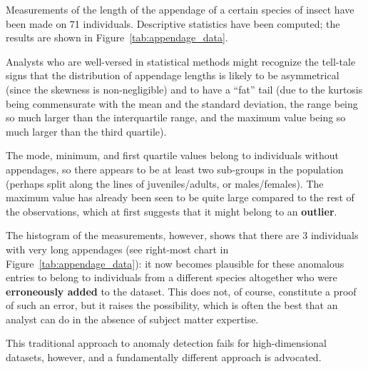 \begin{Example}
Measurements of the length of the appendage of a certain species of insect have been made on 71 individuals. Descriptive statistics have been computed; the results are shown in Figure~\ref{tab:appendage_data}.

\newpage\noindent Analysts who are well-versed in statistical methods might recognize the tell-tale signs that the distribution of appendage lengths is likely to be asymmetrical (since the skewness is non-negligible) and to have a ``fat'' tail (due to the kurtosis being commensurate with the mean and the standard deviation, the range being so much larger than the interquartile range, and the maximum value being so much larger than the third quartile). \par The mode, minimum, and first quartile values belong to individuals without appendages, so there appears to be at least two sub-groups in the population (perhaps split along the lines of juveniles/adults, or males/females). The maximum value has already been seen to be quite large compared to the rest of the observations, which at first suggests that it might belong to an \textbf{outlier}. \par The histogram of the measurements, however, shows that there are 3 individuals with very long appendages (see right-most chart in Figure~\ref{tab:appendage_data}): it now becomes plausible for these anomalous entries to belong to individuals from a different species altogether who were \textbf{erroneously added} to the dataset. This does not, of course, constitute a proof of such an error, but it raises the possibility, which is often the best that an analyst can do in the absence of subject matter expertise.
\end{Example}
\noindent This traditional approach to anomaly detection fails for high-dimensional datasets, however, and a fundamentally different approach is advocated.\newpage  
